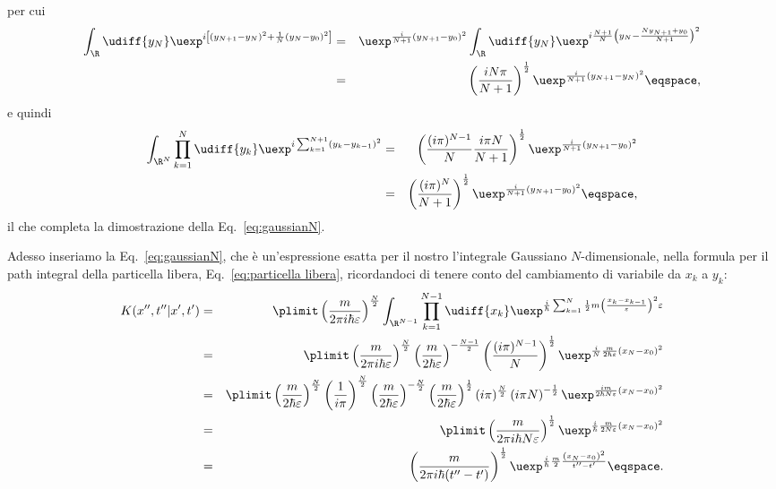 per cui
\begin{eqnarray*}
\int_{\R} \udiff{y_{N}}
\uexp^{ i \left[ \left( y_{N+1} - y_{N} \right)^{2} + \frac{1}{N} \left( y_{N} -
y_{0} \right)^{2} \right] } &=& 
\uexp^{ \frac{i}{N+1} \left( y_{N+1} -
y_{0}\right)^{2}} \int_{\R} \udiff{y_{N}} \uexp^{ i \frac{N+1}{N} \left( y_{N} -
\frac{Ny_{N+1} + y_{0} }{N+1} \right)^{2}}  \\
&=& \left( \frac{i N \pi}{N+1}
\right)^{\frac{1}{2} } \uexp^{ \frac{i}{N+1} \left( y_{N+1} - y_{N} \right)^{2}}
\eqspace, 
\end{eqnarray*}
e quindi
\begin{eqnarray*}
\int_{\R^{N}} \prod_{k=1}^{N} \udiff{y_{k}} \uexp^{ i \sum_{k=1}^{N+1} \left(
y_{k} - y_{k-1}\right)^{2}}&=&
 \left( \frac{(i\pi)^{N-1}}{N} \frac{i\pi N}{N+1} \right)^{\frac{1}{2}} \uexp^{
\frac{i}{N+1} \left( y_{N+1} - y_{0} \right)^{2}} \\
&=& \left(
\frac{(i\pi)^{N}}{N+1} \right)^{\frac{1}{2}} \uexp^{ \frac{i} {N+1} \left(
y_{N+1} - y_{0}\right)^{2}}  \eqspace ,
\end{eqnarray*}
il che completa la dimostrazione della  Eq.~\eqref{eq:gaussianN}.
\par
Adesso inseriamo la Eq.~\eqref{eq:gaussianN}, che \`e un'espressione esatta per
il nostro
l'integrale Gaussiano $N$-dimensionale, 
nella formula per il path integral della particella libera, 
Eq.~\eqref{eq:particella libera}, ricordandoci di tenere conto del cambiamento di variabile da
$x_{k}$ a $y_{k}$:
\begin{eqnarray*}
K(x'', t'' | x', t') &=&
\plimit \left( \frac{m}{2\pi i \hbar \varepsilon} \right)^{\frac{N}{2}}
\int_{\R^{N-1}} \prod_{k=1}^{N-1} \udiff{x_{k}} \uexp^{ \frac{i}{\hbar}
\sum_{k=1}^{N} \frac{1}{2} m \left( \frac{x_{k} - x_{k-1}}{\varepsilon}
\right)^{2} \varepsilon }  \\
&=& 
\plimit \left( \frac{m}{2\pi i \hbar \varepsilon} \right)^{\frac{N}{2}}
\left( \frac{m}{2\hbar\varepsilon}\right)^{- \frac{N-1}{2}}  \left(
\frac{(i\pi)^{N-1}}{N} \right)^{\frac{1}{2}}  \uexp^{\frac{i}{N}
\frac{m}{2\hbar\varepsilon} \left( x_{N} - x_{0} \right)^{2}}\\
&=& 
\plimit  \left( \frac{m}{2\hbar \varepsilon} \right)^{\frac{N}{2}} \left( \frac{1}{i
\pi } \right)^{\frac{N}{2}}  \left( \frac{m}{2\hbar\varepsilon} \right)^{-\frac{N}{2}}
\left( \frac{m }{2\hbar \varepsilon}\right)^{\frac{1}{2}}  (i\pi)^{\frac{N}{2}}
\left(i\pi N\right)^{-\frac{1}{2}}  \uexp^{ 
\frac{im}{2\hbar N\varepsilon}
\left( x_{N} - x_{0} \right)^{2}} \\
&=&
\plimit
\left( \frac{m}{2\pi i \hbar N \varepsilon} \right)^{\frac{1}{2}} \uexp^{
\frac{i}{\hbar} \frac{m}{2 N\varepsilon} \left( x_{N} - x_{0} \right)^{2}} \\
&=& \left( \frac{m} {2\pi i \hbar (t''-t')} \right)^{\frac{1}{2}} \uexp^{
\frac{i}{\hbar} \frac{m}{2} \frac{ \left( x_{N} - x_{0} \right)^{2}}{t'' -t'} }
\eqspace .
\end{eqnarray*}

